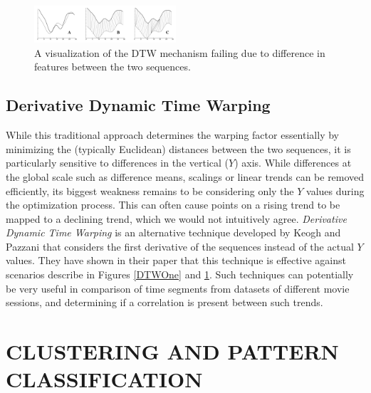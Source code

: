 \documentclass[letterpaper, 10 pt, conference]{ieeeconf}  %
\begin{document}
\begin{figure}[thpb]
  \centering
  \includegraphics[width=0.47\textwidth]{DTWTwo.png}
  \caption{A visualization of the DTW mechanism failing due to difference in features between the two sequences. \cite{doi:10.1137/1.9781611972719.1}}
  \label{DTWTwo}
\end{figure}

\subsection*{Derivative Dynamic Time Warping}

While this traditional approach determines the warping factor essentially by minimizing the (typically Euclidean) distances between the two sequences, it is particularly sensitive to differences in the vertical ($Y$) axis. While differences at the global scale such as difference means, scalings or linear trends can be removed efficiently, its biggest weakness remains to be considering only the $Y$ values during the optimization process. This can often cause points on a rising trend to be mapped to a declining trend, which we would not intuitively agree. \textit{Derivative Dynamic Time Warping} is an alternative technique developed by Keogh and Pazzani \cite{doi:10.1137/1.9781611972719.1} that considers the first derivative of the sequences instead of the actual $Y$ values. They have shown in their paper that this technique is effective against scenarios describe in Figures \ref{DTWOne} and \ref{DTWTwo}. Such techniques can potentially be very useful in comparison of time segments from datasets of different movie sessions, and determining if a correlation is present between such trends.


\section{CLUSTERING AND PATTERN CLASSIFICATION}
\end{document}
